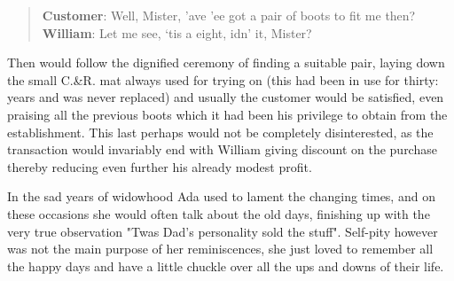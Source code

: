 \begin{quote}
\textbf{Customer}: Well, Mister, 'ave 'ee got a pair of boots to fit me then? \\
\textbf{William}: Let me see, ‘tis a eight, idn’ it, Mister?
\end{quote}


Then would follow the dignified ceremony of finding a suitable pair, laying down the small C.\&R. mat always used for trying on (this had been in use for thirty: years and was never replaced) and usually the customer would be satisfied, even praising all the previous boots which it had been his privilege to obtain from the establishment. This last perhaps would not be completely disinterested, as the transaction would invariably end with William giving discount on the purchase thereby reducing even further his already modest profit.

In the sad years of widowhood Ada used to lament the changing times, and on these occasions she would often talk about the old days, finishing up with the very true observation "Twas Dad’s personality sold the stuff". Self-pity however was not the main purpose of her reminiscences, she just loved to remember all the happy days and have a little chuckle over all the ups and downs of their life.